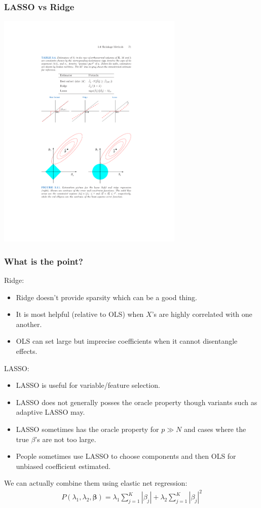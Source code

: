 \documentclass[xcolor=pdftex,dvipsnames,table,mathserif]{beamer}
\begin{document}
\begin{frame}
\frametitle{LASSO vs Ridge}
\begin{center}
\includegraphics[width=3.5in]{./resources/geometry}
\end{center}
\end{frame}

\begin{frame}
\frametitle{What is the point?}
Ridge:
\begin{itemize}
\item Ridge doesn't provide sparsity which can be a good thing.
\item It is most helpful (relative to OLS) when $X$'s are highly correlated with one another.
\item OLS can set large but imprecise coefficients when it cannot disentangle effects.
\end{itemize}
LASSO:
\begin{itemize}
\item LASSO is useful for variable/feature selection.
\item LASSO does not generally posses the \alert{oracle property} though variants such as \alert{adaptive LASSO} may.
\item LASSO sometimes has the oracle property for $p \gg N$ and cases where the true $\beta$'s are not too large.
\item People sometimes use LASSO to choose components and then OLS for unbiased coefficient estimated.
\end{itemize}
We can actually combine them using \alert{elastic net regression}:
\begin{eqnarray*}
 P(\lambda_1,\lambda_2,\mathbf{\beta}) =  \lambda _1\sum_{j=1}^K | \beta_j|  +\lambda_2 \sum_{j=1}^K | \beta_j|^2 
 \end{eqnarray*}
\end{frame}
\end{document}
